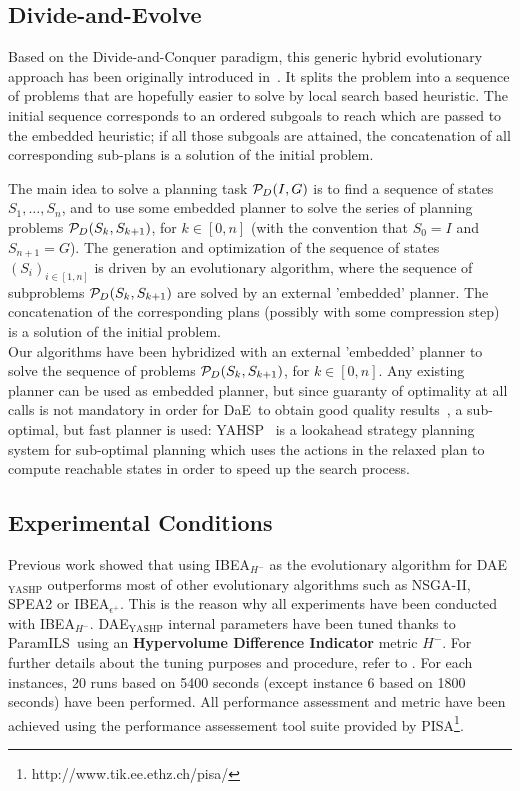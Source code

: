 \documentclass{llncs}
\def\DAE{{\sc DaE}}
\def\YAHSP{{\sc YAHSP}}
\def\PARAMILS{{\sc ParamILS}}
\begin{document}
\subsection{Divide-and-Evolve}
\label{sec:dae}

Based on the Divide-and-Conquer paradigm, this generic hybrid evolutionary approach has been originally introduced in~\cite{Schoenauer2006}.   
It splits the problem into a sequence of problems that are hopefully easier to solve by local search based heuristic. 
The initial sequence corresponds to an ordered subgoals to reach which are passed to the embedded heuristic; if all those subgoals are attained, the concatenation of all corresponding sub-plans is a solution of the initial problem.

The main idea to solve a planning task ${\cal P}_D(I,G)$ is to find a sequence of states $S_1, \ldots, S_n$, and to use some embedded planner to solve the series of planning problems ${\cal P}_D(S_{k},S_{k+1})$, for $k \in [0,n]$ 
(with the convention that $S_0 = I$ and $S_{n+1} = G$).
The generation and optimization of the sequence of states $(S_i)_{i \in [1,n]}$  is driven by an evolutionary algorithm, where the   sequence of subproblems ${\cal P}_D(S_{k},S_{k+1})$ are solved by an external 'embedded'
planner. The concatenation of the corresponding plans  (possibly with some compression step) is a solution of the initial problem.\\

Our algorithms have been hybridized with an external ’embedded’ planner to solve the sequence of problems ${\cal P}_D(S_{k},S_{k+1})$,  for $k \in [0,n]$. 
Any existing planner can be used as embedded planner, but since guaranty of optimality at all calls is not mandatory in order for \DAE\ to obtain good quality results~\cite{Bibai2010}, a sub-optimal, but fast planner is used: \YAHSP~\cite{Vidal2004} is a lookahead 
strategy planning system for sub-optimal planning which uses the  actions in the relaxed plan to compute reachable states in order to speed up the search process.

\subsection{Experimental Conditions}

Previous work \cite{khouadjia:hal-00750560} showed that using IBEA$_{H^-}$ as the evolutionary algorithm for DAE$_{\text{YASHP}}$ outperforms most of other evolutionary algorithms such as NSGA-II, SPEA2 or IBEA$_{\epsilon^+}$. This is the reason why all experiments have been conducted with IBEA$_{H^-}$. DAE$_{\text{YASHP}}$ internal parameters have been tuned thanks to \PARAMILS\ using an {\bf Hypervolume Difference Indicator} metric $H^-$. For further details about the tuning purposes and procedure, refer to \cite{khouadjia:hal-00820617}. For each instances, 20 runs based on 5400 seconds (except instance 6 based on 1800 seconds) have been performed. All performance assessment and metric have been achieved using the performance assessement tool suite provided by PISA\footnote{http://www.tik.ee.ethz.ch/pisa/}. %
\end{document}

